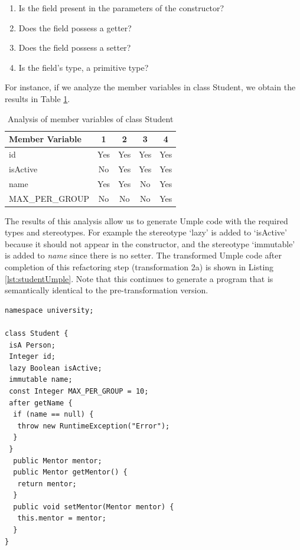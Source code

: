 \begin{enumerate}
\item Is the field present in the parameters of the constructor?
\item Does the field possess a getter?
\item Does the field possess a setter?
\item Is the field's type, a primitive type?
\end{enumerate}

For instance, if we analyze the member variables in class Student, we obtain the results in Table \ref{table:analysisStudent}.

\begin{table}[ht]
\caption{Analysis of member variables of class Student}
\label{table:analysisStudent}
\centering
\begin{tabular}{l|cccc}
\toprule
\rowcolor[HTML]{BBDAFF}
\textbf{Member Variable} & \textbf{1}  & \textbf{2}   & \textbf{3}   & \textbf{4}    \\ \hline
id & Yes &  Yes &  Yes &  Yes \\ 
isActive &  No &  Yes &  Yes &  Yes \\ 
name &  Yes &  Yes &  No &  Yes \\ 
MAX\_PER\_GROUP &  No &  No &  No &  Yes \\ 
\hline
\end{tabular}
\end{table}

The results of this analysis allow us to generate Umple code with the required types and stereotypes. For example the stereotype `lazy' is added to `isActive' because it should not appear in the constructor, and the stereotype `immutable' is added to \textit{name} since there is no setter. The transformed Umple code after completion of this refactoring step (transformation 2a) is shown in Listing \ref{lst:studentUmple}. Note that this continues to generate a program that is semantically identical to the pre-transformation version.

\begin{lstlisting}[style=UmpleOut,caption=Student.ump,label=lst:studentUmple]
namespace university;

class Student { 
 isA Person;
 Integer id; 
 lazy Boolean isActive; 
 immutable name; 
 const Integer MAX_PER_GROUP = 10; 
 after getName {
  if (name == null) { 
   throw new RuntimeException("Error");
  }
 }
  public Mentor mentor; 
  public Mentor getMentor() { 
   return mentor; 
  }
  public void setMentor(Mentor mentor) { 
   this.mentor = mentor; 
  } 
}
\end{lstlisting}

